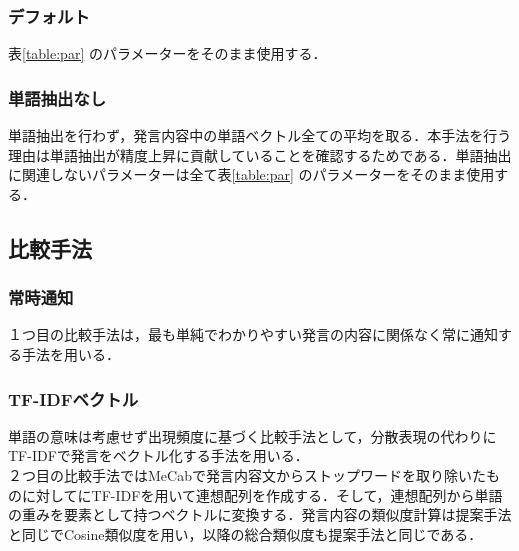 \subsubsection*{ デフォルト}
表\ref{table:par} のパラメーターをそのまま使用する．
\subsubsection*{ 単語抽出なし}
単語抽出を行わず，発言内容中の単語ベクトル全ての平均を取る．本手法を行う理由は単語抽出が精度上昇に貢献していることを確認するためである．単語抽出に関連しないパラメーターは全て表\ref{table:par} のパラメーターをそのまま使用する．

\subsection{比較手法}
\subsubsection*{ 常時通知}
１つ目の比較手法は，最も単純でわかりやすい発言の内容に関係なく常に通知する手法を用いる．
\subsubsection*{ TF-IDFベクトル}
単語の意味は考慮せず出現頻度に基づく比較手法として，分散表現の代わりにTF-IDFで発言をベクトル化する手法を用いる．\\
２つ目の比較手法ではMeCabで発言内容文からストップワードを取り除いたものに対してにTF-IDFを用いて連想配列を作成する．そして，連想配列から単語の重みを要素として持つベクトルに変換する．発言内容の類似度計算は提案手法と同じでCosine類似度を用い，以降の総合類似度も提案手法と同じである．
